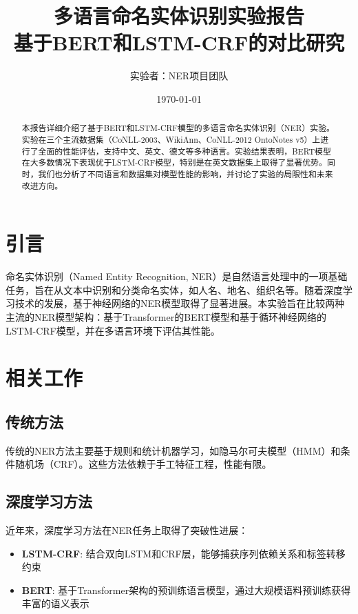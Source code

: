 \documentclass[12pt,a4paper]{article}
\begin{document}
\title{\textbf{多语言命名实体识别实验报告}\\[0.5cm]
\large{基于BERT和LSTM-CRF的对比研究}}
\author{实验者：NER项目团队}
\date{\today}

\maketitle

\begin{abstract}
本报告详细介绍了基于BERT和LSTM-CRF模型的多语言命名实体识别（NER）实验。实验在三个主流数据集（CoNLL-2003、WikiAnn、CoNLL-2012 OntoNotes v5）上进行了全面的性能评估，支持中文、英文、德文等多种语言。实验结果表明，BERT模型在大多数情况下表现优于LSTM-CRF模型，特别是在英文数据集上取得了显著优势。同时，我们也分析了不同语言和数据集对模型性能的影响，并讨论了实验的局限性和未来改进方向。
\end{abstract}

\tableofcontents
\newpage

\section{引言}

命名实体识别（Named Entity Recognition, NER）是自然语言处理中的一项基础任务，旨在从文本中识别和分类命名实体，如人名、地名、组织名等。随着深度学习技术的发展，基于神经网络的NER模型取得了显著进展。本实验旨在比较两种主流的NER模型架构：基于Transformer的BERT模型和基于循环神经网络的LSTM-CRF模型，并在多语言环境下评估其性能。

\section{相关工作}

\subsection{传统方法}
传统的NER方法主要基于规则和统计机器学习，如隐马尔可夫模型（HMM）和条件随机场（CRF）。这些方法依赖于手工特征工程，性能有限。

\subsection{深度学习方法}
近年来，深度学习方法在NER任务上取得了突破性进展：

\begin{itemize}
    \item \textbf{LSTM-CRF}: 结合双向LSTM和CRF层，能够捕获序列依赖关系和标签转移约束
    \item \textbf{BERT}: 基于Transformer架构的预训练语言模型，通过大规模语料预训练获得丰富的语义表示
\end{itemize}
\end{document}
